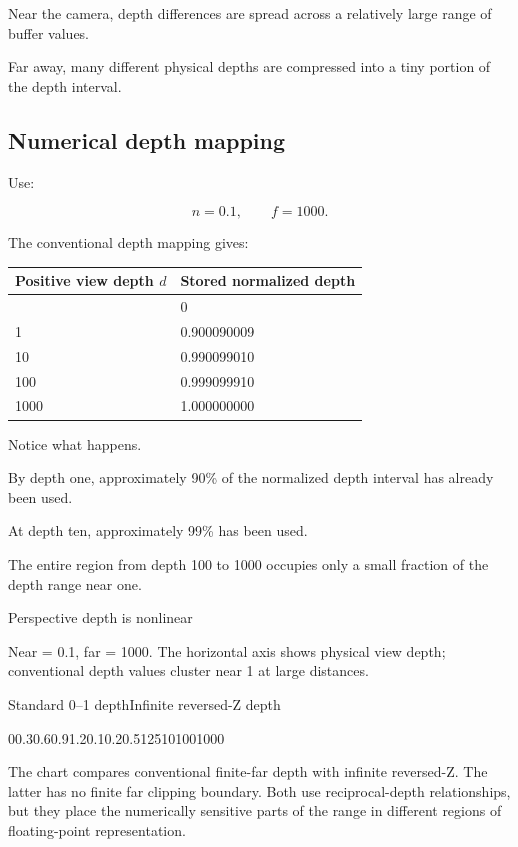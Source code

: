 Near the camera, depth differences are spread across a relatively large range of buffer values.

Far away, many different physical depths are compressed into a tiny portion of the depth interval.

\subsection{Numerical depth mapping}\label{02-foundations-ii-ch033-numerical-depth-mapping}

\hypertarget{02-foundations-ii-ch033-numerical-depth-mapping}{}

Use:

\[
 n=0.1,\qquad f=1000.
\]

The conventional depth mapping gives:

{\def\LTcaptype{none} %
\begin{longtable}[]{@{}ll@{}}
\toprule\noalign{}
Positive view depth \(d\) & Stored normalized depth \\
\midrule\noalign{}
\endhead
\bottomrule\noalign{}
\endlastfoot
0.1 & 0 \\
1 & 0.900090009 \\
10 & 0.990099010 \\
100 & 0.999099910 \\
1000 & 1.000000000 \\
\end{longtable}
}

Notice what happens.

By depth one, approximately 90\% of the normalized depth interval has already been used.

At depth ten, approximately 99\% has been used.

The entire region from depth 100 to 1000 occupies only a small fraction of the depth range near one.

Perspective depth is nonlinear

Near = 0.1, far = 1000. The horizontal axis shows physical view depth; conventional depth values cluster near 1 at large distances.

Standard 0--1 depthInfinite reversed-Z depth

00.30.60.91.20.10.20.5125101001000

The chart compares conventional finite-far depth with infinite reversed-Z. The latter has no finite far clipping boundary. Both use reciprocal-depth relationships, but they place the numerically sensitive parts of the range in different regions of floating-point representation.

